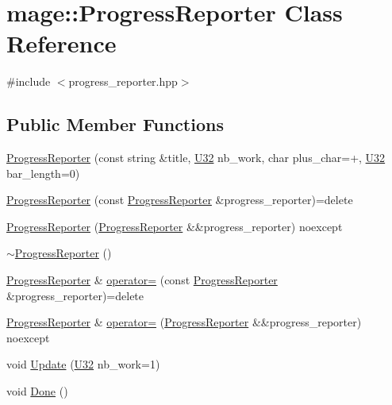 \hypertarget{classmage_1_1_progress_reporter}{}\section{mage\+:\+:Progress\+Reporter Class Reference}
\label{classmage_1_1_progress_reporter}


{\ttfamily \#include $<$progress\+\_\+reporter.\+hpp$>$}

\subsection*{Public Member Functions}
\begin{DoxyCompactItemize}
\item 
\hyperlink{classmage_1_1_progress_reporter_a9b218a43aa52a644aa92ada4a0ac50e3}{Progress\+Reporter} (const string \&title, \hyperlink{namespacemage_a41c104c036fba3756a74e19f793eeaa1}{U32} nb\+\_\+work, char plus\+\_\+char=\textquotesingle{}+\textquotesingle{}, \hyperlink{namespacemage_a41c104c036fba3756a74e19f793eeaa1}{U32} bar\+\_\+length=0)
\item 
\hyperlink{classmage_1_1_progress_reporter_a59c1ca6e4c0d480a1726d79ef6d42e74}{Progress\+Reporter} (const \hyperlink{classmage_1_1_progress_reporter}{Progress\+Reporter} \&progress\+\_\+reporter)=delete
\item 
\hyperlink{classmage_1_1_progress_reporter_ab36c4cf6e03bfa90ea07d64c74726ec9}{Progress\+Reporter} (\hyperlink{classmage_1_1_progress_reporter}{Progress\+Reporter} \&\&progress\+\_\+reporter) noexcept
\item 
\hyperlink{classmage_1_1_progress_reporter_aa543239c6dd4474a77cf4cf6904c1b26}{$\sim$\+Progress\+Reporter} ()
\item 
\hyperlink{classmage_1_1_progress_reporter}{Progress\+Reporter} \& \hyperlink{classmage_1_1_progress_reporter_a7bc52147f6d2e30d897f512f910c8917}{operator=} (const \hyperlink{classmage_1_1_progress_reporter}{Progress\+Reporter} \&progress\+\_\+reporter)=delete
\item 
\hyperlink{classmage_1_1_progress_reporter}{Progress\+Reporter} \& \hyperlink{classmage_1_1_progress_reporter_a9659be73a34ed6978c607684bec76f02}{operator=} (\hyperlink{classmage_1_1_progress_reporter}{Progress\+Reporter} \&\&progress\+\_\+reporter) noexcept
\item 
void \hyperlink{classmage_1_1_progress_reporter_a62009a4466cdd2766afee0da34338338}{Update} (\hyperlink{namespacemage_a41c104c036fba3756a74e19f793eeaa1}{U32} nb\+\_\+work=1)
\item 
void \hyperlink{classmage_1_1_progress_reporter_a11d758647ac2082bc296ab53a7454eaa}{Done} ()
\end{DoxyCompactItemize}
